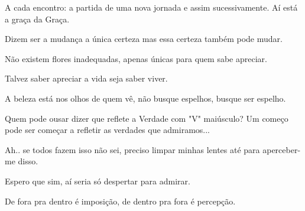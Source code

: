 A cada encontro: a partida de uma nova jornada e assim sucessivamente. Aí está a graça da Graça. 

Dizem ser a mudança a única certeza mas essa certeza também pode mudar. 

Não existem flores inadequadas, apenas únicas para quem sabe apreciar.  

Talvez saber apreciar a vida seja saber viver.  

A beleza está nos olhos de quem vê, não busque espelhos, busque ser espelho. 

Quem pode ousar dizer que reflete a Verdade com "V" maiúsculo? Um começo pode ser começar a refletir as verdades que admiramos...  

Ah.. se todos fazem isso não sei, preciso limpar minhas lentes até para aperceber-me disso. 

Espero que sim, aí seria só despertar para admirar. 

De fora pra dentro é imposição, de dentro pra fora é percepção. 